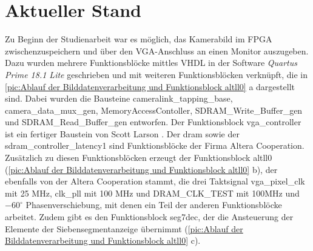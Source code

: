 \documentclass[ngerman,12pt]{article} %
\begin{document}
{%
\section{Aktueller Stand}
\label{sec:Stand zu Bearbeitungsbeginn}
Zu Beginn der Studienarbeit war es möglich, das Kamerabild im FPGA zwischenzuspeichern und über den VGA-Anschluss an einen Monitor auszugeben. Dazu wurden mehrere Funktionsblöcke mittles VHDL in der Software \textit{Quartus Prime 18.1 Lite} geschrieben und mit weiteren Funktionsblöcken verknüpft, die in \autoref{pic:Ablauf der Bilddatenverarbeitung und Funktionsblock altll0} a dargestellt sind. Dabei wurden die Bausteine cameralink\_tapping\_base, camera\_data\_mux\_gen, MemoryAccessContoller, SDRAM\_Write\_Buffer\_gen und SDRAM\_Read\_Buffer\_gen entworfen. Der Funktionsblock vga\_controller ist ein fertiger Baustein von Scott Larson \cite{Digi-Key}. Der dram sowie der sdram\_controller\_latency1 sind Funktionsblöcke der Firma Altera Cooperation. Zusätzlich zu diesen Funktionsblöcken erzeugt der Funktionsblock altll0 (\autoref{pic:Ablauf der Bilddatenverarbeitung und Funktionsblock altll0} b), der ebenfalls von der Altera Cooperation stammt, die drei Taktsignal vga\_pixel\_clk mit 25 MHz, clk\_pll mit 100 MHz und DRAM\_CLK\_TEST mit 100MHz und $-60^\circ$ Phasenverschiebung, mit denen ein Teil der anderen Funktionsblöcke arbeitet. Zudem gibt es den Funktionsblock seg7dec, der die Ansteuerung der Elemente der Siebensegmentanzeige übernimmt (\autoref{pic:Ablauf der Bilddatenverarbeitung und Funktionsblock altll0} c).

}
\end{document}
